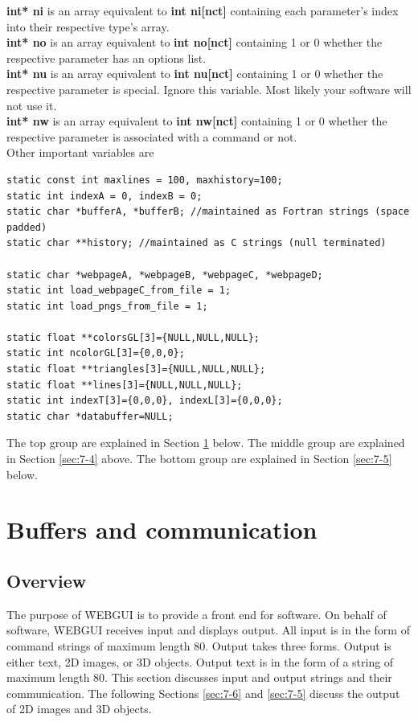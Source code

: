 \textbf{int* ni} is an array equivalent to \textbf{int ni[nct]} containing each parameter's index into their respective type's array.\\
\textbf{int* no} is an array equivalent to \textbf{int no[nct]} containing 1 or 0 whether the respective parameter has an options list.\\
\textbf{int* nu} is an array equivalent to \textbf{int nu[nct]} containing 1 or 0 whether the respective parameter is special. Ignore
this variable. Most likely your software will not use it.\\
\textbf{int* nw} is an array equivalent to \textbf{int nw[nct]} containing 1 or 0 whether the respective parameter is associated with 
a command or not.\\

Other important variables are
\begin{verbatim}
static const int maxlines = 100, maxhistory=100;
static int indexA = 0, indexB = 0;
static char *bufferA, *bufferB; //maintained as Fortran strings (space padded)
static char **history; //maintained as C strings (null terminated)

static char *webpageA, *webpageB, *webpageC, *webpageD;
static int load_webpageC_from_file = 1;
static int load_pngs_from_file = 1;

static float **colorsGL[3]={NULL,NULL,NULL};
static int ncolorGL[3]={0,0,0};
static float **triangles[3]={NULL,NULL,NULL};
static float **lines[3]={NULL,NULL,NULL};
static int indexT[3]={0,0,0}, indexL[3]={0,0,0};
static char *databuffer=NULL;
\end{verbatim}

The top group are explained in Section \ref{sec:7-3} below. The middle group are explained in Section \ref{sec:7-4} above.
The bottom group are explained in Section \ref{sec:7-5} below.

\section{Buffers and communication}
\label{sec:7-3}

\subsection{Overview}
The purpose of \f{WEBGUI} is to provide a front end for software. On behalf of software, \f{WEBGUI} receives input and displays output.
All input is in the form of command strings of maximum length 80. Output takes three forms. Output is either text, 2D images, 
or 3D objects. Output text is in the form of a string of maximum length 80. This section discusses input and output
strings and their communication. The following Sections \ref{sec:7-6} and \ref{sec:7-5} discuss the output of 2D images and 3D objects.

